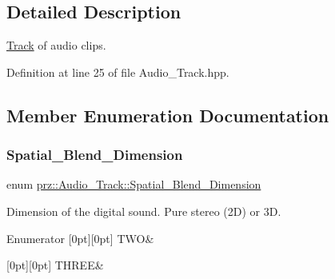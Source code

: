 \subsection{Detailed Description}
\mbox{\hyperlink{classprz_1_1_track}{Track}} of audio clips. 



Definition at line 25 of file Audio\+\_\+\+Track.\+hpp.



\subsection{Member Enumeration Documentation}
\mbox{\label{classprz_1_1_audio___track_a4fb1dc3dd45713ba4c3e56918721d12a}} 
\subsubsection{\texorpdfstring{Spatial\_Blend\_Dimension}{Spatial\_Blend\_Dimension}}
{\footnotesize\ttfamily enum \mbox{\hyperlink{classprz_1_1_audio___track_a4fb1dc3dd45713ba4c3e56918721d12a}{prz\+::\+Audio\+\_\+\+Track\+::\+Spatial\+\_\+\+Blend\+\_\+\+Dimension}}}



Dimension of the digital sound. Pure stereo (2D) or 3D. 

\begin{DoxyEnumFields}{Enumerator}
[0pt][0pt]{}\mbox{\label{classprz_1_1_audio___track_a4fb1dc3dd45713ba4c3e56918721d12aa43821963797a936302adb2b0909da866}} 
T\+WO&\\
\hline

[0pt][0pt]{}\mbox{\label{classprz_1_1_audio___track_a4fb1dc3dd45713ba4c3e56918721d12aae008fd40b2713ad1259054014d113239}} 
T\+H\+R\+EE&\\
\hline

\end{DoxyEnumFields}


